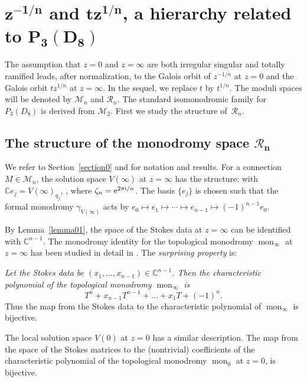 \documentclass[pdftex]{sigma}
\numberwithin{equation}{section}
\begin{document}
\section[1/(n-th root z) and t*(n-th root z), a hierarchy related to P3(D8)]{$\boldsymbol{z^{-1/n}}$ and $\boldsymbol{tz^{1/n}}$, a hierarchy related to $\boldsymbol{P_3(D_8)}$}\label{twelve}

The assumption that $z=0$ and $z=\infty$ are both irregular singular and totally ramified leads, after normalization, to the Galois orbit
of $z^{-1/n}$ at $z=0$ and the Galois orbit $tz^{1/n}$ at $z=\infty$. In the sequel, we replace $t$ by $t^{1/n}$. The moduli spaces will
be denoted by $\mathcal{M}_n$ and $\mathcal{R}_n$. The standard isomonodromic family for $P_3(D_8)$ is derived from
$\mathcal{M}_2$. First we study the structure of~$\mathcal{R}_n$.


\subsection[The structure of the monodromy space R\_n]{The structure of the monodromy space $\boldsymbol{\mathcal{R}_n}$}
We refer to Section~\ref{section0} and \cite[Sections~8 and 9]{vdP-Si} for notation and results.
 For a connection $M\in \mathcal{M}_n$, the solution space $V(\infty)$ at $z=\infty$ has the
 structure:
  with $\mathbb{C}e_j= V(\infty)_{q_j}$,
 ,
 where $\zeta_n={\rm e}^{2\pi {\rm i}/n}$. The basis $\{e_j\}$ is chosen such that the formal monodromy $\gamma_{V(\infty)}$
 acts by $e_0\mapsto e_1 \mapsto \cdots \mapsto e_{n-1}\mapsto (-1)^{n-1}e_0$.

 By Lemma~\ref{lemma01}, the space of the Stokes data at $z=\infty$ can be identified with $\mathbb{C}^{n-1}$.
 The monodromy identity for the topological monodromy $\operatorname{mon}_\infty$ at $z=\infty$ has been studied
in detail in \cite[pp.~146--147]{CM-vdP}. The {\it surprising property} is:

 {\it Let the Stokes data be $(x_1,\dots ,x_{n-1})\in \mathbb{C}^{n-1}$. Then the characteristic polynomial
 of the topological monodromy $\operatorname{mon}_{\infty}$ is} \[ T^n+x_{n-1}T^{n-1}+\dots +x_1T+(-1)^{n}.\]
 Thus the map from the Stokes data to the characteristic polynomial of $\operatorname{mon}_\infty$ is bijective.

The local solution space $V(0)$ at $z=0$ has a similar description. The map
from the space of the Stokes matrices to the (nontrivial) coefficients of the characteristic polynomial of the topological monodromy $\operatorname{mon}_0$ at $z=0$, is bijective.
\end{document}
